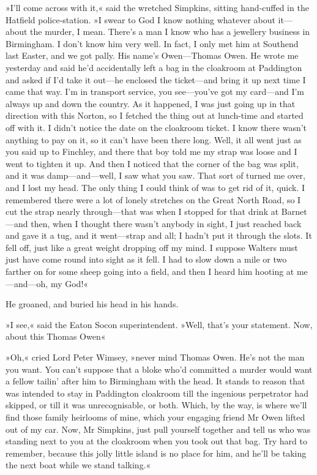»I'll come across with it,« said the wretched Simpkins, sitting hand-cuffed in the Hatfield police-station. »I swear to God I know nothing whatever about it—about the murder, I mean. There's a man I know who has a jewellery business in Birmingham. I don't know him very well. In fact, I only met him at Southend last Easter, and we got pally. His name's Owen—Thomas Owen. He wrote me yesterday and said he'd accidentally left a bag in the cloakroom at Paddington and asked if I'd take it out—he enclosed the ticket—and bring it up next time I came that way. I'm in transport service, you see—you've got my card—and I'm always up and down the country. As it happened, I was just going up in that direction with this Norton, so I fetched the thing out at lunch-time and started off with it. I didn't notice the date on the cloakroom ticket. I know there wasn't anything to pay on it, so it can't have been there long. Well, it all went just as you said up to Finchley, and there that boy told me my strap was loose and I went to tighten it up. And then I noticed that the corner of the bag was split, and it was damp—and—well, I saw what you saw. That sort of turned me over, and I lost my head. The only thing I could think of was to get rid of it, quick. I remembered there were a lot of lonely stretches on the Great North Road, so I cut the strap nearly through—that was when I stopped for that drink at Barnet—and then, when I thought there wasn't anybody in sight, I just reached back and gave it a tug, and it went—strap and all; I hadn't put it through the slots. It fell off, just like a great weight dropping off my mind. I suppose Walters must just have come round into sight as it fell. I had to slow down a mile or two farther on for some sheep going into a field, and then I heard him hooting at me—and—oh, my God!«

He groaned, and buried his head in his hands.

»I see,« said the Eaton Socon superintendent. »Well, that's your statement. Now, about this Thomas Owen\longdash«

»Oh,« cried Lord Peter Wimsey, »never mind Thomas Owen. He's not the man you want. You can't suppose that a bloke who'd committed a murder would want a fellow tailin' after him to Birmingham with the head. It stands to reason that was intended to stay in Paddington cloakroom till the ingenious perpetrator had skipped, or till it was unrecognisable, or both. Which, by the way, is where we'll find those family heirlooms of mine, which your engaging friend Mr Owen lifted out of my car. Now, Mr Simpkins, just pull yourself together and tell us who was standing next to you at the cloakroom when you took out that bag. Try hard to remember, because this jolly little island is no place for him, and he'll be taking the next boat while we stand talking.«


